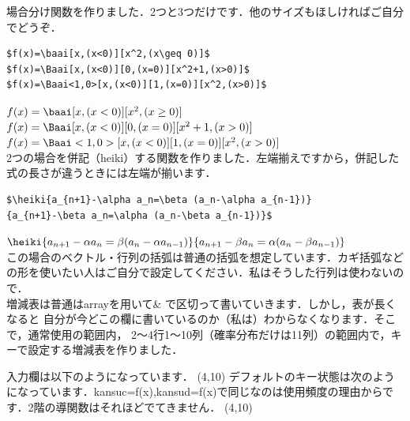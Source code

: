 \documentclass [10pt,fleqn,b5paper]{jsarticlek}
\begin{document}
{{\bigskip
{}
場合分け関数を作りました．2つと3つだけです．他のサイズもほしければご自分でどうぞ．
\aki\\
\aki
\begin{Verbatim}
$f(x)=\baai[x,(x<0)][x^2,(x\geq 0)]$
$f(x)=\Baai[x,(x<0)][0,(x=0)][x^2+1,(x>0)]$
$f(x)=\Baai<1,0>[x,(x<0)][1,(x=0)][x^2,(x>0)]$
\end{Verbatim}
\bigskip
$f(x)=\baai[x,(x<0)][x^2,(x\geq 0)]$
$f(x)=\Baai[x,(x<0)][0,(x=0)][x^2+1,(x>0)]$
$f(x)=\Baai<1,0>[x,(x<0)][1,(x=0)][x^2,(x>0)]$
\aki\\
\aki
2つの場合を併記（heiki）する関数を作りました．左端揃えですから，併記した式の長さが違うときには左端が揃います．
\aki\\
\aki
\begin{Verbatim}
$\heiki{a_{n+1}-\alpha a_n=\beta (a_n-\alpha a_{n-1})}
{a_{n+1}-\beta a_n=\alpha (a_n-\beta a_{n-1})}$
\end{Verbatim}
\bigskip
$\heiki{a_{n+1}-\alpha a_n=\beta (a_n-\alpha a_{n-1})}
{a_{n+1}-\beta a_n=\alpha (a_n-\beta a_{n-1})}$
\\
この場合のベクトル・行列の括弧は普通の括弧を想定しています．カギ括弧などの形を使いたい人はご自分で設定してください．私はそうした行列は使わないので．
\\

増減表は普通はarrayを用いて\& で区切って書いていきます．しかし，表が長くなると
自分が今どこの欄に書いているのか（私は）わからなくなります．そこで，通常使用の範囲内，
2〜4行1〜10列（確率分布だけは11列）の範囲内で，キーで設定する増減表を作りました．

入力欄は以下のようになっています．
\RESETKEYA
{}
\zogen(4,10)
デフォルトのキー状態は次のようになっています．kansuc=f(x),kansud=f(x)で同じなのは使用頻度の理由からです．2階の導関数はそれほどでてきません．
\RESETKEYA
\zogen(4,10)

}}
\end{document}
